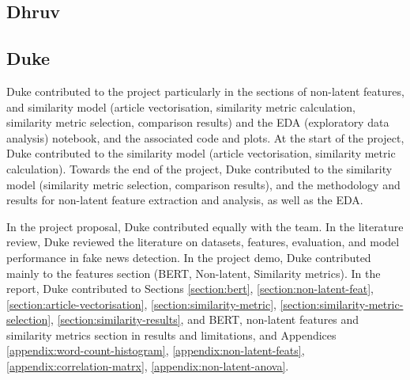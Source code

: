 \documentclass{article}
\begin{document}
\begin{appendices}
\subsection{Dhruv}


\subsection{Duke}
Duke contributed to the project particularly in the sections of non-latent features, and similarity model (article vectorisation, similarity metric calculation, similarity metric selection, comparison results) and the EDA (exploratory data analysis) notebook, and the associated code and plots. At the start of the project, Duke contributed to the similarity model (article vectorisation, similarity metric calculation). Towards the end of the project, Duke contributed to the similarity model (similarity metric selection, comparison results), and the methodology and results for non-latent feature extraction and analysis, as well as the EDA.

In the project proposal, Duke contributed equally with the team. In the literature review, Duke reviewed the literature on datasets, features, evaluation, and model performance in fake news detection. In the project demo, Duke contributed mainly to the features section (BERT, Non-latent, Similarity metrics). In the report, Duke contributed to Sections \ref{section:bert}, \ref{section:non-latent-feat}, \ref{section:article-vectorisation}, \ref{section:similarity-metric}, \ref{section:similarity-metric-selection}, \ref{section:similarity-results}, and BERT, non-latent features and similarity metrics section in results and limitations, and Appendices \ref{appendix:word-count-histogram}, \ref{appendix:non-latent-feats}, \ref{appendix:correlation-matrx}, \ref{appendix:non-latent-anova}.

\label{appendix:article-scraping}


\end{appendices}
\end{document}
